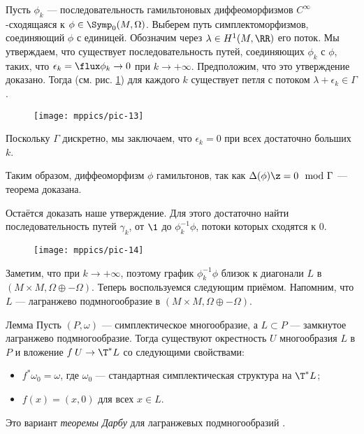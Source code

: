 Пусть $\phi_k$ — последовательность гамильтоновых диффеоморфизмов $C^\infty$-сходящаяся к $\phi\in\Symp_0(M,\Omega)$.
Выберем путь симплектоморфизмов, соединяющий $\phi$ с единицей.
Обозначим через $\lambda \in H^1 (M, \RR)$ его поток.
Мы утверждаем, что существует последовательность путей, соединяющих $\phi_k$ с $\phi$, 
таких, что $\epsilon_k=\flux \phi_k\to 0$ при $k\to +\infty$.
Предположим, что это утверждение доказано.
Тогда (см. рис. \ref{pic-13}) для каждого $k$ существует петля с потоком $\lambda + \epsilon_k\in \Gamma$.
\begin{figure}[ht!]
\centering
\texttt{[image: mppics/pic-13]}
\caption{}\label{pic-13}
\vskip0mm
\end{figure}
Поскольку $\Gamma$ дискретно, мы заключаем, что $\epsilon_k=0$ при всех достаточно больших $k$.



Таким образом, диффеоморфизм $\phi$ гамильтонов, так как $\Delta(\phi) \z= 0 \mod{\Gamma}$  — теорема доказана.

Остаётся доказать наше утверждение.
Для этого достаточно найти последовательность путей $\gamma_k$, от
$\1$ до $\phi_k^{-1}\phi$, потоки которых сходятся к $0$.

\begin{figure}[ht!]
\centering
\texttt{[image: mppics/pic-14]}
\caption{}\label{pic-14}
\vskip0mm
\end{figure}

Заметим, что  при $k \to
+\infty$, поэтому график
$\phi_k^{-1}\phi$ близок к диагонали $L$ в $(M \times M, \Omega \oplus
-\Omega)$. 
Теперь воспользуемся следующим приёмом.
Напомним, что $L$ — лагранжево подмногообразие в $(M \times M,
\Omega \oplus -\Omega)$.

\begin{thm}{Лемма}
Пусть $(P, \omega)$ — симплектическое многообразие, а $L\subset P$
— замкнутое лагранжево подмногообразие. 
Тогда существуют окрестность $U$ многообразия $L$ в $P$ и вложение
$f\: U \to \T^\ast L$ со следующими свойствами: 
\begin{itemize}
\item $f^\ast\omega_0 = \omega$, где $\omega_0$ — стандартная симплектическая структура на $\T^\ast L$;
\item $f(x) = (x,0)$ для всех $x\in L$.
\end{itemize}
\end{thm}
Это вариант \emph{теоремы Дарбу} для лагранжевых
подмногообразий \cite{MS}. 

